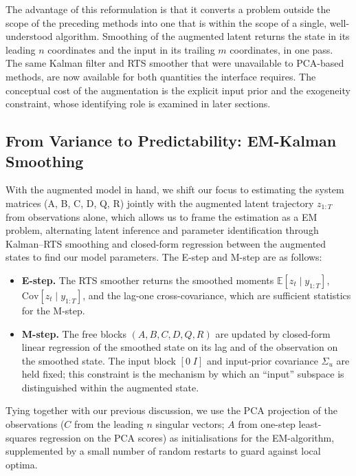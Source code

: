 \documentclass[11pt,a4paper]{article}
\begin{document}
The advantage of this reformulation is that it converts a problem outside the scope of the preceding methods into one that is within the scope of a single, well-understood algorithm. Smoothing of the augmented latent returns the state in its leading $n$ coordinates and the input in its trailing $m$ coordinates, in one pass. The same Kalman filter and RTS smoother that were unavailable to PCA-based methods, are now available for both quantities the interface requires. The conceptual cost of the augmentation is the explicit input prior and the exogeneity constraint, whose identifying role is examined in later sections.


\subsection{From Variance to Predictability: EM-Kalman Smoothing}

With the augmented model in hand, we shift our focus to estimating the
system matrices (A, B, C, D, Q, R) jointly with the augmented latent
trajectory $z_{1:T}$ from observations alone, which allows us to frame
the estimation as a EM problem, alternating latent inference and parameter identification through Kalman--RTS smoothing and closed-form regression between the augmented states to find our model parameters. The E-step and M-step are as follows:

\begin{itemize}[leftmargin=1.5em, itemsep=0.1em]
\item \textbf{E-step.} The RTS smoother returns the smoothed moments
  $\mathbb{E}[z_t \mid y_{1:T}]$, $\mathrm{Cov}[z_t \mid y_{1:T}]$, and
  the lag-one cross-covariance, which are sufficient statistics for the
  M-step.
\item \textbf{M-step.} The free blocks $(A, B, C, D, Q, R)$ are updated
  by closed-form linear regression of the smoothed state on its lag and
  of the observation on the smoothed state. The input block $[0\;I]$
  and input-prior covariance $\Sigma_u$ are held fixed; this constraint
  is the mechanism by which an ``input'' subspace is distinguished
  within the augmented state.
\end{itemize}

Tying together with our previous discussion, we use the PCA projection of the observations ($C$ from the
leading $n$ singular vectors; $A$ from one-step least-squares regression
on the PCA scores) as initialisations for the EM-algorithm, supplemented by a small number of random restarts to
guard against local optima.
\end{document}
